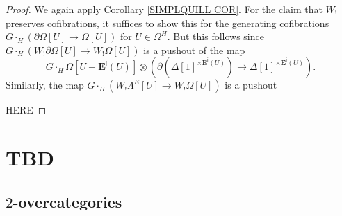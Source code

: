 \documentclass[a4paper,10pt
,draft
]{article}%
\renewcommand{\1}{\eta}%
\begin{document}
\begin{proof}
	We again apply Corollary \ref{SIMPLQUILL COR}.
	For the claim that $W_!$ preserves cofibrations,
	it suffices to show this for the generating cofibrations
	$G\cdot_H \left( \partial \Omega[U] \to \Omega[U] \right)$ for $U \in \Omega^H$.
	But this follows since 
	$G \cdot_H \left(W_! \partial \Omega[U] \to W_! \Omega[U] \right)$
	is a pushout of the map
\[
	G \cdot_H \Omega[U - \boldsymbol{E}^{\mathsf{i}}(U)]
\otimes
	\left(
	\partial \left( \Delta[1]^{\times \boldsymbol{E}^{\mathsf{i}}(U) } \right) 
		\to
	\Delta[1]^{\times \boldsymbol{E}^{\mathsf{i}}(U) }
	\right).
\]
Similarly, the map
	$G \cdot_H \left(W_! \Lambda^E[U] \to W_! \Omega[U] \right)$
is a pushout 


{\color{red} HERE}
	
\end{proof}




\section{TBD}


\subsection{$2$-overcategories}
\end{document}
